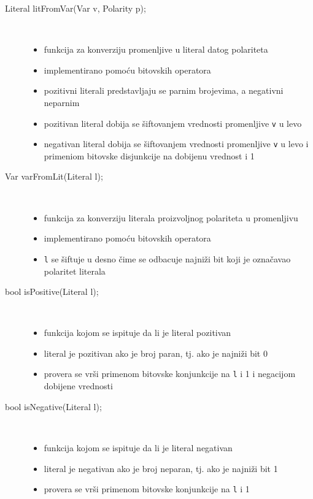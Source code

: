 \documentclass[a4paper, 12pt]{article}
\begin{document}
\begin{description}
	\item[Literal litFromVar(Var v, Polarity p);] ~ 
	\begin{itemize}
		\item funkcija za konverziju promenljive u literal datog polariteta
		\item implementirano pomoću bitovskih operatora
		\item pozitivni literali predstavljaju se parnim brojevima, a negativni neparnim
		\item pozitivan literal dobija se šiftovanjem vrednosti promenljive \verb|v| u levo
		\item negativan literal dobija se šiftovanjem vrednosti promenljive \verb|v| u levo i primeniom bitovske disjunkcije na dobijenu vrednost i 1
	\end{itemize}

	\item[Var varFromLit(Literal l);] ~ 
	\begin{itemize}
		\item funkcija za konverziju literala proizvoljnog polariteta u promenljivu
		\item implementirano pomoću bitovskih operatora 
		\item \verb|l| se šiftuje u desno čime se odbacuje najniži bit koji je označavao polaritet literala
	\end{itemize}
	
	\item[bool isPositive(Literal l);] ~ 
	\begin{itemize}
		\item funkcija kojom se ispituje da li je literal pozitivan 
		\item literal je pozitivan ako je broj paran, tj. ako je najniži bit 0
		\item provera se vrši primenom bitovske konjunkcije na \verb|l| i 1 i negacijom dobijene vrednosti
	\end{itemize}

	\item[bool isNegative(Literal l);] ~ 
	\begin{itemize}
		\item funkcija kojom se ispituje da li je literal negativan 
		\item literal je negativan ako je broj neparan, tj. ako je najniži bit 1
		\item provera se vrši primenom bitovske konjunkcije na \verb|l| i 1
	\end{itemize}


\end{description}
\end{document}
